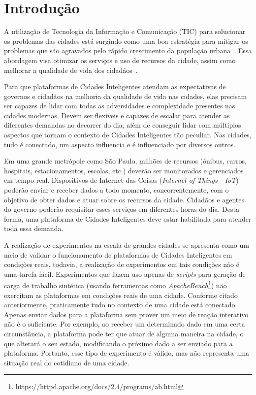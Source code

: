 \chapter{Introdução}
\label{cap:introducao}


A utilização de Tecnologia da Informação e Comunicação (TIC) para solucionar os problemas das cidades está surgindo como uma boa estratégia para mitigar os problemas que são agravados pelo rápido crescimento da população urbana~\cite{chourabi_2012}.
Essa abordagem visa otimizar os serviços e uso de recursos da cidade, assim como melhorar a qualidade de vida dos cidadãos~\cite{santana_2016}.

Para que plataformas de Cidades Inteligentes atendam as expectativas de governos e cidadãos na melhoria da qualidade de vida nas cidades, elas precisam ser capazes de lidar com todas as adversidades e
complexidade presentes nas cidades modernas.
Devem ser flexíveis e capazes de escalar para atender as diferentes demandas no decorrer do dia, além de conseguir lidar com múltiplos aspectos que tornam o contexto de Cidades Inteligentes tão
peculiar.
Nas cidades, tudo é conectado, um aspecto influencia e é influenciado por diversos outros.

Em uma grande metrópole como São Paulo, milhões de recursos (ônibus, carros, hospitais, estacionamentos, escolas, etc.) deverão ser monitorados e gerenciados em tempo real.
Dispositivos de Internet das Coisas (\textit{Internet of Things - IoT}) poderão enviar e receber dados a todo momento, concorrentemente, com o objetivo de obter dados e atuar sobre os recursos da cidade.
Cidadãos e agentes do governo poderão requisitar esses serviços em diferentes horas do dia.
Desta forma, uma plataforma de Cidades Inteligentes deve estar habilitada para atender toda essa demanda.

A realização de experimentos na escala de grandes cidades se apresenta como um meio de validar o funcionamento de plataformas de Cidades Inteligentes em condições reais, todavia, a realização de
experimentos em tais condições não é uma tarefa fácil.
Experimentos que fazem uso apenas de \textit{scripts} para geração de carga de trabalho sintética (usando ferramentas como \textit{ApacheBench}\footnote{https://httpd.apache.org/docs/2.4/programs/ab.html})
não exercitam as plataformas em condições reais de uma cidade.
Conforme citado anteriormente, praticamente tudo no contexto de uma cidade está conectado.
Apenas enviar dados para a plataforma sem prover um meio de reação interativo não é o suficiente.
Por exemplo, ao receber um determinado dado em uma certa circunstância, a plataforma pode ter que atuar de alguma maneira na cidade, o que alterará o seu estado, modificando o próximo dado a ser enviado 
para a plataforma.
Portanto, esse tipo de experimento é válido, mas não representa uma situação real do cotidiano de uma cidade.


